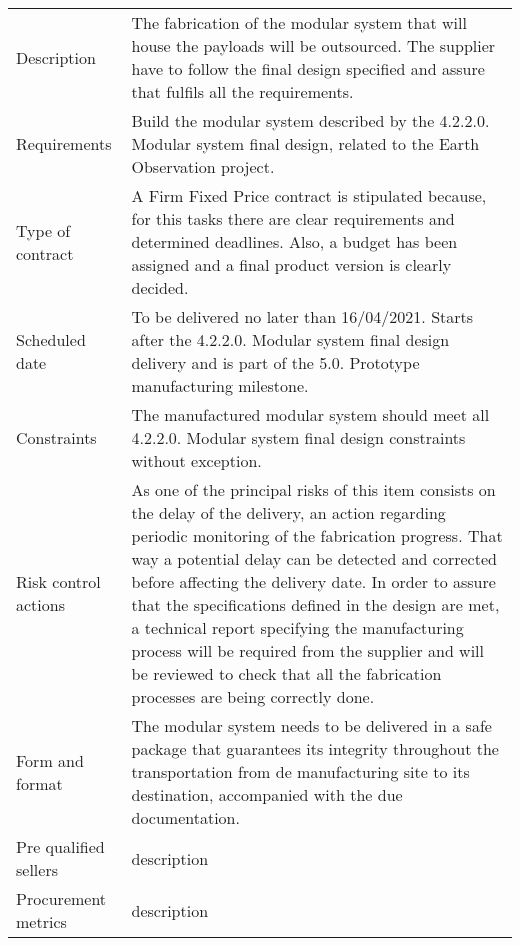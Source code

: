 \begin{table}[H]
	\centering
	\begin{tabular}
		{>{\raggedright\arraybackslash}p{3cm} >{\arraybackslash}p{11cm}}
		
		\toprule[2pt]
		
		\multicolumn{2}{c}{\textbf{SOW - 5.1.2. Manufacturing of modular system}}\\
		
		\midrule[1.5pt]
		
		Description & The fabrication of the modular system that will house the payloads will be outsourced. The supplier have to follow the final design specified and assure that fulfils all the requirements. \\
		\hline
		
		Requirements & Build the modular system described by the 4.2.2.0. Modular system final design, related to the Earth Observation project.\\
		\hline
		
		Type of contract & A Firm Fixed Price contract is stipulated because, for this tasks there are clear requirements and determined deadlines. Also, a budget has been assigned and a final product version is clearly decided.\\
		\hline
		
		Scheduled date & To be delivered no later than 16/04/2021. Starts after the 4.2.2.0. Modular system final design delivery and is part of the 5.0. Prototype manufacturing milestone.\\
		\hline
		
		Constraints & The manufactured modular system should meet all 4.2.2.0. Modular system final design constraints without exception.\\
		\hline
		
		Risk control actions & As one of the principal risks of this item consists on the delay of the delivery, an action regarding periodic monitoring of the fabrication progress. That way a potential delay can be detected and corrected before affecting the delivery date.
		In order to assure that the specifications defined in the design are met, a technical report specifying the manufacturing process will be required from the supplier and will be reviewed to check that all the fabrication processes are being correctly done.\\
		\hline
		
		Form and format & The modular system needs to be delivered in a safe package that guarantees its integrity throughout the transportation from de manufacturing site to its destination, accompanied with the due documentation.\\
		\hline
		
		Pre qualified sellers & description\\
		\hline
		
		Procurement metrics & description\\
		
		\bottomrule[2pt]		
		
	\end{tabular}
\end{table}

